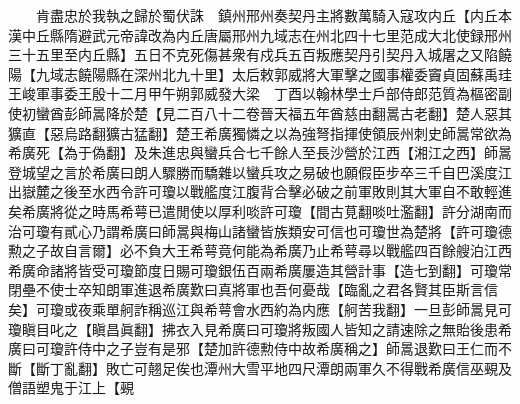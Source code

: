 　　肯盡忠於我執之歸於蜀伏誅　鎮州邢州奏契丹主將數萬騎入寇攻内丘【内丘本漢中丘縣隋避武元帝諱改為内丘唐屬邢州九域志在州北四十七里范成大北使録邢州三十五里至内丘縣】五日不克死傷甚衆有戍兵五百叛應契丹引契丹入城屠之又陷饒陽【九域志饒陽縣在深州北九十里】太后敕郭威將大軍擊之國事權委竇貞固蘇禹珪王峻軍事委王殷十二月甲午朔郭威發大梁　丁酉以翰林學士戶部侍郎范質為樞密副使初蠻酋彭師暠降於楚【見二百八十二卷晉天福五年酋慈由翻暠古老翻】楚人惡其獷直【惡烏路翻獷古猛翻】楚王希廣獨憐之以為強弩指揮使領辰州刺史師暠常欲為希廣死【為于偽翻】及朱進忠與蠻兵合七千餘人至長沙營於江西【湘江之西】師暠登城望之言於希廣曰朗人驟勝而驕雜以蠻兵攻之易破也願假臣步卒三千自巴溪度江出嶽麓之後至水西令許可瓊以戰艦度江腹背合擊必破之前軍敗則其大軍自不敢輕進矣希廣將從之時馬希萼已遣閒使以厚利啖許可瓊【間古莧翻啖吐濫翻】許分湖南而治可瓊有貳心乃謂希廣曰師暠與梅山諸蠻皆族類安可信也可瓊世為楚將【許可瓊德勲之子故自言爾】必不負大王希萼竟何能為希廣乃止希萼尋以戰艦四百餘艘泊江西希廣命諸將皆受可瓊節度日賜可瓊銀伍百兩希廣屢造其營計事【造七到翻】可瓊常閉壘不使士卒知朗軍進退希廣歎曰真將軍也吾何憂哉【臨亂之君各賢其臣斯言信矣】可瓊或夜乘單舸詐稱巡江與希萼會水西約為内應【舸苦我翻】一旦彭師暠見可瓊瞋目叱之【瞋昌眞翻】拂衣入見希廣曰可瓊將叛國人皆知之請速除之無貽後患希廣曰可瓊許侍中之子豈有是邪【楚加許德勲侍中故希廣稱之】師暠退歎曰王仁而不斷【斷丁亂翻】敗亡可翹足俟也潭州大雪平地四尺潭朗兩軍久不得戰希廣信巫覡及僧語塑鬼于江上【覡